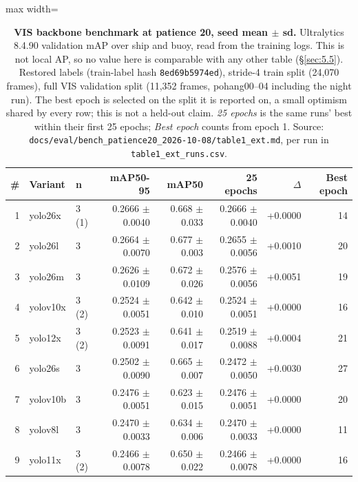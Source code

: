 \documentclass[10pt]{article}
\begin{document}
\begin{table}[htbp]
\centering
\footnotesize
\caption{\textbf{VIS backbone benchmark at patience 20, seed mean $\pm$ sd.} Ultralytics 8.4.90 validation mAP over ship and buoy, read from the training logs. This is not local AP, so no value here is comparable with any other table (\S\ref{sec:5.5}). Restored labels (train-label hash \texttt{8ed69b5974ed}), stride-4 train split (24,070 frames), full VIS validation split (11,352 frames, pohang00--04 including the night run). The best epoch is selected on the split it is reported on, a small optimism shared by every row; this is not a held-out claim. \emph{25 epochs} is the same runs' best within their first 25 epochs; \emph{Best epoch} counts from epoch 1. Source: \texttt{docs/\allowbreak{}eval/\allowbreak{}bench\_\allowbreak{}patience20\_\allowbreak{}2026-10-08/\allowbreak{}table1\_\allowbreak{}ext.md}, per run in \texttt{table1\_\allowbreak{}ext\_\allowbreak{}runs.csv}.}
\label{tab:1}
\setlength{\tabcolsep}{3pt}
\begin{adjustbox}{max width=\linewidth}
\begin{tabular}{rllrrrrr}
\toprule
\# & Variant & n & mAP50-95 & mAP50 & 25 epochs & $\Delta$ & Best epoch \\
\midrule
1 & yolo26x & 3 (1\textdagger{}) & 0.2666 $\pm$ 0.0040 & 0.668 $\pm$ 0.033 & 0.2666 $\pm$ 0.0040 & +0.0000 & 14 \\
2 & yolo26l & 3 & 0.2664 $\pm$ 0.0070 & 0.677 $\pm$ 0.003 & 0.2655 $\pm$ 0.0056 & +0.0010 & 20 \\
3 & yolo26m & 3 & 0.2626 $\pm$ 0.0109 & 0.672 $\pm$ 0.026 & 0.2576 $\pm$ 0.0056 & +0.0051 & 19 \\
4 & yolov10x & 3 (2\textdagger{}) & 0.2524 $\pm$ 0.0051 & 0.642 $\pm$ 0.010 & 0.2524 $\pm$ 0.0051 & +0.0000 & 16 \\
5 & yolo12x & 3 (2\textdagger{}) & 0.2523 $\pm$ 0.0091 & 0.641 $\pm$ 0.017 & 0.2519 $\pm$ 0.0088 & +0.0004 & 21 \\
6 & yolo26s & 3 & 0.2502 $\pm$ 0.0090 & 0.665 $\pm$ 0.007 & 0.2472 $\pm$ 0.0050 & +0.0030 & 27 \\
7 & yolov10b & 3 & 0.2476 $\pm$ 0.0051 & 0.623 $\pm$ 0.015 & 0.2476 $\pm$ 0.0051 & +0.0000 & 20 \\
8 & yolov8l & 3 & 0.2470 $\pm$ 0.0033 & 0.634 $\pm$ 0.006 & 0.2470 $\pm$ 0.0033 & +0.0000 & 11 \\
9 & yolo11x & 3 (2\textdagger{}) & 0.2466 $\pm$ 0.0078 & 0.650 $\pm$ 0.022 & 0.2466 $\pm$ 0.0078 & +0.0000 & 16 \\

\end{tabular}
\end{adjustbox}
\end{table}
\end{document}
